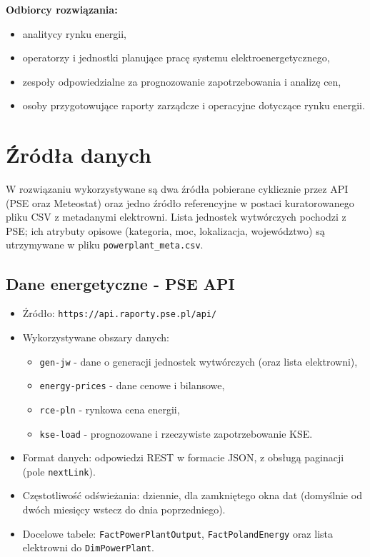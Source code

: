 \documentclass[12pt]{article}
\begin{document}
	\textbf{Odbiorcy rozwiązania:}
	\begin{itemize}
		\item analitycy rynku energii,
		\item operatorzy i jednostki planujące pracę systemu elektroenergetycznego,
		\item zespoły odpowiedzialne za prognozowanie zapotrzebowania i analizę cen,
		\item osoby przygotowujące raporty zarządcze i operacyjne dotyczące rynku energii.
	\end{itemize}

	\section{Źródła danych}

	W rozwiązaniu wykorzystywane są dwa źródła pobierane cyklicznie przez API (PSE oraz Meteostat) oraz jedno źródło referencyjne w postaci kuratorowanego pliku CSV z metadanymi elektrowni. Lista jednostek wytwórczych pochodzi z PSE; ich atrybuty opisowe (kategoria, moc, lokalizacja, województwo) są utrzymywane w pliku \texttt{powerplant\_meta.csv}.

	\subsection{Dane energetyczne - PSE API}
	\begin{itemize}
		\item Źródło: \texttt{https://api.raporty.pse.pl/api/}
		\item Wykorzystywane obszary danych:
		\begin{itemize}
			\item \texttt{gen-jw} - dane o generacji jednostek wytwórczych (oraz lista elektrowni),
			\item \texttt{energy-prices} - dane cenowe i bilansowe,
			\item \texttt{rce-pln} - rynkowa cena energii,
			\item \texttt{kse-load} - prognozowane i rzeczywiste zapotrzebowanie KSE.
		\end{itemize}
		\item Format danych: odpowiedzi REST w formacie JSON, z obsługą paginacji (pole \texttt{nextLink}).
		\item Częstotliwość odświeżania: dziennie, dla zamkniętego okna dat (domyślnie od dwóch miesięcy wstecz do dnia poprzedniego).
		\item Docelowe tabele: \texttt{FactPowerPlantOutput}, \texttt{FactPolandEnergy} oraz lista elektrowni do \texttt{DimPowerPlant}.
	\end{itemize}
\end{document}
